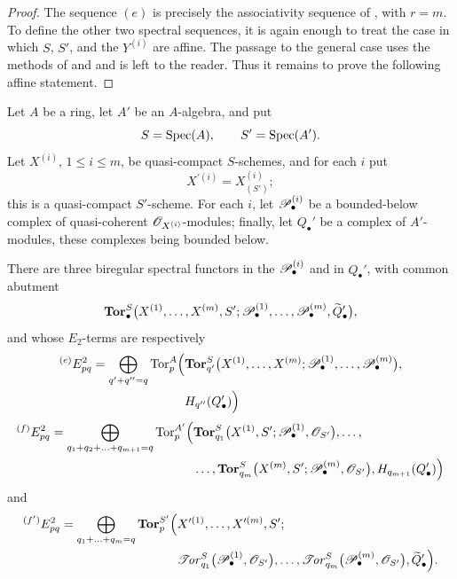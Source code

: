 \begin{proof}
The sequence $(e)$ is precisely the associativity sequence of
, with $r=m$.  To define the other two spectral
sequences, it is again enough to treat the case in which $S$, $S'$,
and the $Y^{(i)}$ are affine.  The passage to the general case uses
the methods of  and  and is left to
the reader.  Thus it remains to prove the following affine
statement.
\end{proof}

\begin{corollary}[6.9.4]
\label{III.6.9.4}
Let $A$ be a ring, let $A'$ be an $A$-algebra, and put
\[
  S=\operatorname{Spec}(A),
  \qquad
  S'=\operatorname{Spec}(A').
\]
Let $X^{(i)}$, $1\leq i\leq m$, be quasi-compact $S$-schemes, and
for each $i$ put
\[
  X^{\prime(i)}=X_{(S')}^{(i)};
\]
this is a quasi-compact $S'$-scheme.  For each $i$, let
$\mathscr{P}_\bullet^{(i)}$ be a bounded-below complex of quasi-coherent
$\mathscr{O}_{X^{(i)}}$-modules; finally, let $Q_\bullet'$ be a
complex of $A'$-modules, these complexes being bounded below.

There are three biregular spectral functors in the
$\mathscr{P}_\bullet^{(i)}$ and in $Q_\bullet'$, with common abutment
\[
  \mathbf{Tor}_\bullet^S
  \bigl(
    X^{(1)},\ldots,X^{(m)},S';
    \mathscr{P}_\bullet^{(1)},\ldots,\mathscr{P}_\bullet^{(m)},
    \widetilde Q_\bullet'
  \bigr),
\]
and whose $E_2$-terms are respectively
\[
\begin{split}
  {}^{(e)}E_{pq}^2
  =
  \bigoplus_{q'+q''=q}
  \operatorname{Tor}_p^A
  \Bigl(
    &
    \mathbf{Tor}_{q'}^S
    \bigl(
      X^{(1)},\ldots,X^{(m)};
      \mathscr{P}_\bullet^{(1)},\ldots,\mathscr{P}_\bullet^{(m)}
    \bigr),
    \\
    &
    H_{q''}(Q_\bullet')
  \Bigr)
\end{split}
\]
\[
\begin{split}
  {}^{(f)}E_{pq}^2
  =
  \bigoplus_{q_1+q_2+\ldots+q_{m+1}=q}
  \operatorname{Tor}_p^{A'}
  \Bigl(
    &
    \mathbf{Tor}_{q_1}^S
    \bigl(
      X^{(1)},S';
      \mathscr{P}_\bullet^{(1)},\mathscr{O}_{S'}
    \bigr),
    \ldots,
    \\
    &
    \ldots,
    \mathbf{Tor}_{q_m}^S
    \bigl(
      X^{(m)},S';
      \mathscr{P}_\bullet^{(m)},\mathscr{O}_{S'}
    \bigr),
    H_{q_{m+1}}(Q_\bullet')
  \Bigr)
\end{split}
\]
and
\[
\begin{split}
  {}^{(f')}E_{pq}^2
  =
  \bigoplus_{q_1+\ldots+q_m=q}
  \mathbf{Tor}_p^{S'}
  \Bigl(
    &
    X^{\prime(1)},\ldots,X^{\prime(m)},S';
    \\
    &
    \mathscr{T}\!\mathit{or}_{q_1}^S
    \bigl(
      \mathscr{P}_\bullet^{(1)},\mathscr{O}_{S'}
    \bigr),
    \ldots,
    \mathscr{T}\!\mathit{or}_{q_m}^S
    \bigl(
      \mathscr{P}_\bullet^{(m)},\mathscr{O}_{S'}
    \bigr),
    \widetilde Q_\bullet'
  \Bigr).
\end{split}
\]
\end{corollary}

